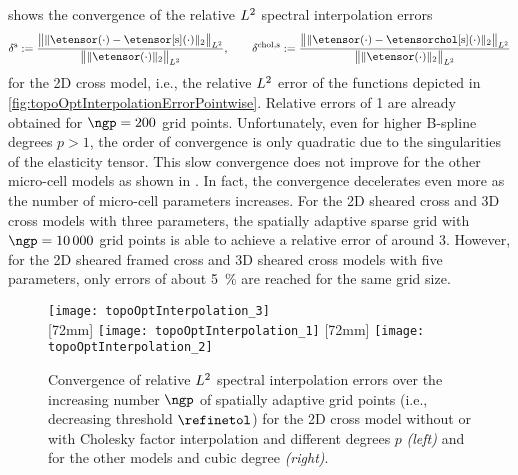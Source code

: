  shows
the convergence of the relative $L^2$ spectral interpolation errors
\begin{equation}
  \delta^{\sparse} :=
  \frac{
    \normLtwoscaled{
      \vphantom{\big(}
      \norm[2]{\etensor({\cdot}) - \etensorintp({\cdot})}
    }
  }{
    \normLtwoscaled{
      \vphantom{\big(}
      \norm[2]{\etensor({\cdot})}
    }
  }, \qquad
  \delta^{\chol,\sparse} :=
  \frac{
    \normLtwoscaled{
      \vphantom{\big(}
      \norm[2]{\etensor({\cdot}) - \etensorcholintp({\cdot})}
    }
  }{
    \normLtwoscaled{
      \vphantom{\big(}
      \norm[2]{\etensor({\cdot})}
    }
  }
\end{equation}
for the 2D cross model, i.e.,
the relative $L^2$ error of the functions depicted in
\cref{fig:topoOptInterpolationErrorPointwise}.
Relative errors of \SI{1}{\permille} are already obtained
for $\ngp = 200$ grid points.
Unfortunately, even for higher B-spline degrees $p > 1$,
the order of convergence is only quadratic
due to the singularities of the elasticity tensor.
This slow convergence does not improve for the other
micro-cell models as shown in
.
In fact, the convergence decelerates even more
as the number of micro-cell parameters increases.
For the 2D sheared cross and 3D cross models with three parameters,
the spatially adaptive sparse grid with $\ngp = \num{10000}$ grid points
is able to achieve a relative error of around \SI{3}{\permille}.
However, for the 2D sheared framed cross and 3D sheared cross models
with five parameters, only errors of about \SI{5}{\percent} are reached
for the same grid size.

\begin{figure}
  \hspace*{5mm}%
  \texttt{[image: topoOptInterpolation\_3]}%
  \hfill%
  \\[2mm]%
  [72mm]{%
    \texttt{[image: topoOptInterpolation\_1]}%
  }%
  \hfill%
  [72mm]{%
    \texttt{[image: topoOptInterpolation\_2]}%
  }%
  \caption[Convergence of relative $L^2$ spectral interpolation errors]{%
    Convergence of relative $L^2$ spectral interpolation errors
    over the increasing number $\ngp$ of spatially adaptive grid points
    (i.e., decreasing threshold $\refinetol$)
    for the 2D cross model without or with Cholesky factor interpolation
    and different degrees $p$ \emph{(left)} and
    for the other models and cubic degree \emph{(right)}.%
  }%
  \label{fig:topoOptInterpolationErrorBasisFunctions}%
\end{figure}



